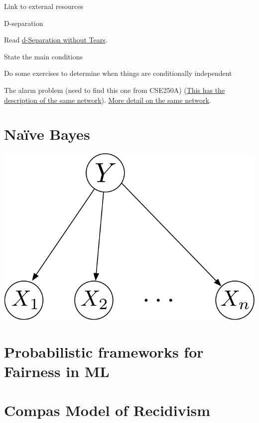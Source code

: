 \documentclass[assignment02_Solutions]{subfiles}
\begin{document}
\bi
\item Link to external resources
\item D-separation
\begin{externalresources}
Read \href{http://bayes.cs.ucla.edu/BOOK-09/ch11-1-2-final.pdf}{d-Separation without Tears}.
\end{externalresources}
\item State the main conditions
\item Do some exercises to determine when things are conditionally independent
\ei

\begin{exercise}
The alarm problem (need to find this one from CSE250A) (\href{http://aima.eecs.berkeley.edu/slides-pdf/chapter14a.pdf}{This has the description of the same network}).  \href{https://people.cs.pitt.edu/~milos/courses/cs2740/Lectures/class19.pdf}{More detail on the same network}.
\end{exercise}

\section{Na\"ive Bayes}
\begin{marginfigure}
\includegraphics[width=\linewidth]{figures/naivebayesgm}
\end{marginfigure}

\section{Probabilistic frameworks for Fairness in ML}

\section{Compas Model of Recidivism}
\end{document}
